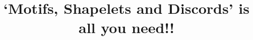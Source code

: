 \documentclass[xcolor=dvipsnames,compress,t,pdf,9pt]{beamer}
\title[\insertframenumber /\inserttotalframenumber]{`Motifs, Shapelets and Discords' is all you need!!}
\begin{document}
	\begin{frame}
	\titlepage
	\end{frame}
	
  
	
	
\end{document}
